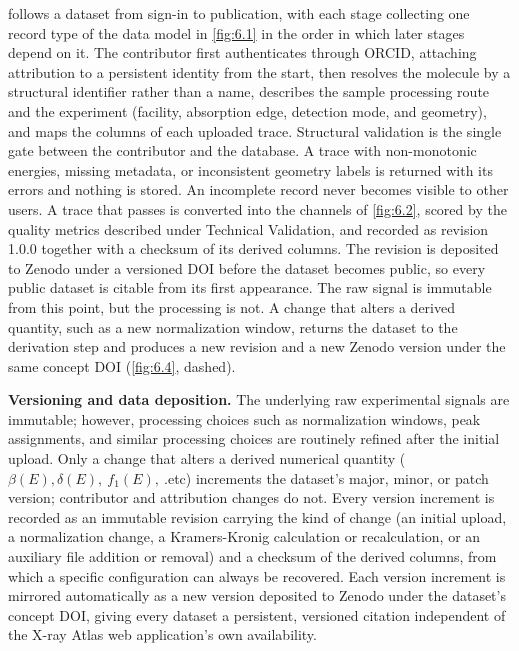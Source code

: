  follows a dataset from sign-in to publication, with each stage collecting one record type of the data model in \cref{fig:6.1} in the order in which later stages depend on it. The contributor first authenticates through ORCID, attaching attribution to a persistent identity from the start, then resolves the molecule by a structural identifier rather than a name, describes the sample processing route and the experiment (facility, absorption edge, detection mode, and geometry), and maps the columns of each uploaded trace. Structural validation is the single gate between the contributor and the database. A trace with non-monotonic energies, missing metadata, or inconsistent geometry labels is returned with its errors and nothing is stored. An incomplete record never becomes visible to other users. A trace that passes is converted into the channels of \cref{fig:6.2}, scored by the quality metrics described under Technical Validation, and recorded as revision 1.0.0 together with a checksum of its derived columns. The revision is deposited to Zenodo under a versioned DOI before the dataset becomes public, so every public dataset is citable from its first appearance. The raw signal is immutable from this point, but the processing is not. A change that alters a derived quantity, such as a new normalization window, returns the dataset to the derivation step and produces a new revision and a new Zenodo version under the same concept DOI (\cref{fig:6.4}, dashed).

\textbf{Versioning and data deposition.} The underlying raw experimental signals are immutable; however, processing choices such as normalization windows, peak assignments, and similar processing choices are routinely refined after the initial upload. Only a change that alters a derived numerical quantity (\(\beta(E),\delta(E),\ f_{1}(E),\ \).etc) increments the dataset's major, minor, or patch version; contributor and attribution changes do not. Every version increment is recorded as an immutable revision carrying the kind of change (an initial upload, a normalization change, a Kramers-Kronig calculation or recalculation, or an auxiliary file addition or removal) and a checksum of the derived columns, from which a specific configuration can always be recovered. Each version increment is mirrored automatically as a new version deposited to Zenodo under the dataset's concept DOI, giving every dataset a persistent, versioned citation independent of the X-ray Atlas web application's own availability.

